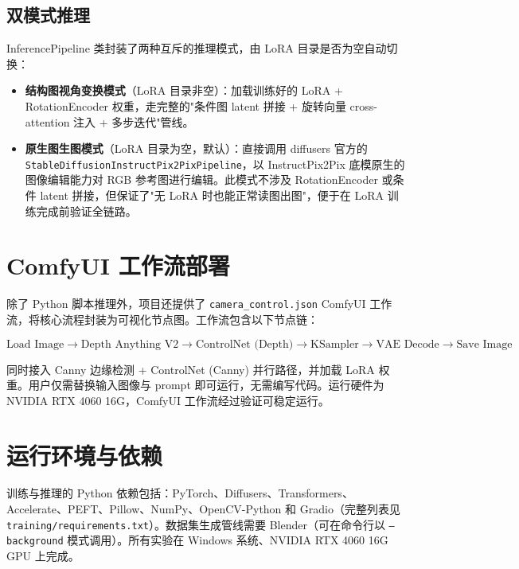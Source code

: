 \subsection{双模式推理}

InferencePipeline 类封装了两种互斥的推理模式，由 LoRA 目录是否为空自动切换：

\begin{itemize}
    \item \textbf{结构图视角变换模式}（LoRA 目录非空）：加载训练好的 LoRA + RotationEncoder 权重，走完整的"条件图 latent 拼接 + 旋转向量 cross-attention 注入 + 多步迭代"管线。
    \item \textbf{原生图生图模式}（LoRA 目录为空，默认）：直接调用 diffusers 官方的 \texttt{StableDiffusionInstructPix2PixPipeline}，以 InstructPix2Pix 底模原生的图像编辑能力对 RGB 参考图进行编辑。此模式不涉及 RotationEncoder 或条件 latent 拼接，但保证了"无 LoRA 时也能正常读图出图"，便于在 LoRA 训练完成前验证全链路。
\end{itemize}

\section{ComfyUI 工作流部署}

除了 Python 脚本推理外，项目还提供了 \texttt{camera\_control.json} ComfyUI 工作流，将核心流程封装为可视化节点图。工作流包含以下节点链：

\[
\text{Load Image} \to \text{Depth Anything V2} \to \text{ControlNet (Depth)} \to \text{KSampler} \to \text{VAE Decode} \to \text{Save Image}
\]

同时接入 Canny 边缘检测 + ControlNet (Canny) 并行路径，并加载 LoRA 权重。用户仅需替换输入图像与 prompt 即可运行，无需编写代码。运行硬件为 NVIDIA RTX 4060 16G，ComfyUI 工作流经过验证可稳定运行。

\section{运行环境与依赖}

训练与推理的 Python 依赖包括：PyTorch、Diffusers、Transformers、Accelerate、PEFT、Pillow、NumPy、OpenCV-Python 和 Gradio（完整列表见 \texttt{training/requirements.txt}）。数据集生成管线需要 Blender（可在命令行以 \texttt{--background} 模式调用）。所有实验在 Windows 系统、NVIDIA RTX 4060 16G GPU 上完成。

